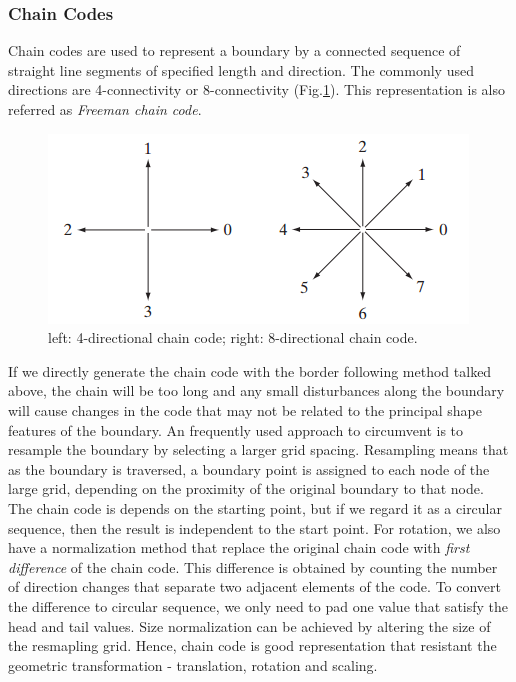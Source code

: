 \subsubsection{Chain Codes}
Chain codes are used to represent a boundary by a connected sequence of straight line segments of specified length and direction. The commonly used directions are 4-connectivity or 8-connectivity (Fig.\ref{fig:10direction}). This representation is also referred as \emph{Freeman chain code}.
\begin{figure}[h!]
	\centering
	\includegraphics[width=0.45\linewidth]{myfigure/p10/direction.png}
	\caption{left: 4-directional chain code; right: 8-directional chain code.}
	\label{fig:10direction}
\end{figure}
If we directly generate the chain code with the border following method talked above, the chain will be too long and any small disturbances along the boundary will cause changes in the code that may not be related to the principal shape features of the boundary. An frequently used approach to circumvent is to resample the boundary by selecting a larger grid spacing. Resampling means that as the boundary is traversed, a boundary point is assigned to each node of the large grid, depending on the proximity of the original boundary to that node. The chain code is depends on the starting point, but if we regard it as a circular sequence, then the result is independent to the start point. For rotation, we also have a normalization method that replace the original chain code with \emph{first difference} of the chain code. This difference is obtained by counting the number of direction changes that separate two adjacent elements of the code. To convert the difference to circular sequence, we only need to pad one value that satisfy the head and tail values. Size normalization can be achieved by altering the size of the resmapling grid. Hence, chain code is good representation that resistant the geometric transformation - translation, rotation and scaling.

